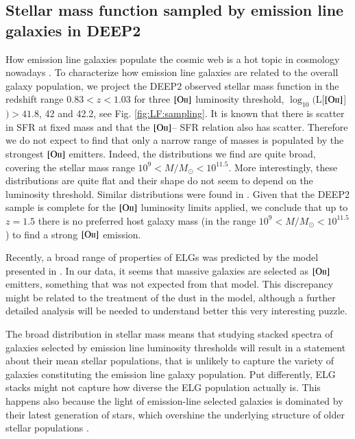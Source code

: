 \documentclass[onecolumn]{aa}
\newcommand{\OII}{$\left[\mathrm{O\textrm{\textsc{ii}}}\right]$\xspace}
\begin{document}
\subsection{Stellar mass function sampled by emission line galaxies in DEEP2}
\label{sec:application:elg}
How emission line galaxies populate the cosmic web is a hot topic in cosmology nowadays \citep{favole_2015_elg,2017MNRAS.472..550F,raichoor_2017MNRAS.471.3955R,2017arXiv170807628G}. 
To characterize how emission line galaxies are related to the overall galaxy population, we project the DEEP2 observed stellar mass function in the redshift range $0.83<z<1.03$ for three \OII luminosity threshold, $\log_{10}($L[\OII]$)>41.8$, 42 and 42.2, see Fig.  \ref{fig:LF:sampling}. 
It is known that there is scatter in SFR at fixed mass and that the \OII -- SFR relation also has scatter. 
Therefore we do not expect to find that only a narrow range of masses is populated by the strongest \OII emitters.
Indeed, the distributions we find are quite broad, covering the stellar mass range $10^9<M/M_{\odot}<10^{11.5}$. 
More interestingly, these distributions are quite flat and their shape do not seem to depend on the luminosity threshold. 
Similar distributions were found in \citet{raichoor_2017MNRAS.471.3955R}. 
Given that the DEEP2 sample is complete for the \OII luminosity limits applied, we  conclude that up to $z=1.5$ there is no preferred host galaxy mass (in the range $10^9<M/M_{\odot}<10^{11.5}$) to find a strong \OII emission.

Recently, a broad range of properties of ELGs was predicted by the model presented in \citet{2017arXiv170807628G}. 
In our data, it seems that massive galaxies are selected as \OII emitters, something that was not expected from that model. 
This discrepancy might be related to the treatment of the dust in the model, although a further detailed analysis will be needed to understand better this very interesting puzzle.

The broad distribution in stellar mass means that studying stacked spectra of galaxies selected by emission line luminosity thresholds will result in a statement about their mean stellar populations, that is unlikely to capture the variety of galaxies constituting the emission line galaxy population.
Put differently, ELG stacks might not capture how diverse the ELG population actually is.  
This happens also because the light of emission-line selected galaxies is dominated by their latest generation of stars, which overshine the underlying structure of older stellar populations \citep[known as the 'iceberg effect'][]{2010MNRAS.407..830M}. 
\end{document}
